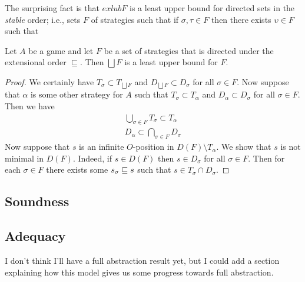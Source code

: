 \documentclass{article}
\newcommand{\exle}{\sqsubseteq}
\newcommand{\exlub}{\bigsqcup}
\begin{document}
The surprising fact is that $exlub F$ is a least upper bound for directed sets in the \emph{stable} order; i.e., sets $F$ of strategies such that if $\sigma,\tau\in F$ then there exists $\upsilon\in F$ such that 

\begin{proposition}
  Let $A$ be a game and let $F$ be a set of strategies that is directed under the extensional order $\exle$.  Then $\exlub F$ is a least upper bound for $F$.
  \begin{proof}
    We certainly have $T_\sigma\subset T_{\exlub F}$ and $D_{\exlub F}\subset D_\sigma$ for all $\sigma\in F$.  Now suppose that $\alpha$ is some other strategy for $A$ such that $T_\sigma\subset T_\alpha$ and $D_\alpha\subset D_\sigma$ for all $\sigma\in F$.  Then we have
    \begin{gather*}
      \bigcup_{\sigma\in F}T_\sigma\subset T_\alpha \\
      D_\alpha\subset \bigcap_{\sigma\in F} D_\sigma
    \end{gather*}
    Now suppose that $s$ is an infinite $O$-position in $D(F)\setminus T_\alpha$.  We show that $s$ is not minimal in $D(F)$.  Indeed, if $s\in D(F)$ then $s\in D_\sigma$ for all $\sigma\in F$.  Then for each $\sigma\in F$ there exists some $s_\sigma\sqsubseteq s$ such that $s\in T_\sigma\cap D_\sigma$.   
  \end{proof}
\end{proposition}

\subsection{Soundness}

\subsection{Adequacy}

I don't think I'll have a full abstraction result yet, but I could add a section explaining how this model gives us some progress towards full abstraction.  



\end{document}
